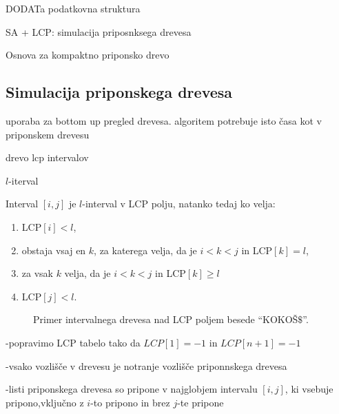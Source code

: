 DODATa podatkovna struktura

SA + LCP: simulacija priposnksega drevesa


Osnova za kompaktno priponsko drevo


\cite{Abouelhoda2004}   

\cite{Manber1990}

\subsection{Simulacija priponskega drevesa}\label{sec:STsimulacija}

uporaba za bottom up pregled drevesa. algoritem potrebuje isto časa kot v priponskem drevesu
\cite{Kasai2001}

drevo lcp intervalov 

$l$-iterval 

\begin{defi}
    Interval $[i,j]$ je $l$-interval v LCP polju, natanko tedaj ko velja:
    \begin{enumerate}
        \item LCP$[i]<l$,
        \item obstaja vsaj en $k$, za katerega velja, da je $i< k< j$ in LCP$[k]=l$,
        \item za vsak $k$ velja, da je $i< k< j$ in LCP$[k]\ge l$
        \item LCP$[j]<l$.      
    \end{enumerate}
\end{defi}

\begin{figure}[htb]
    \begin{subfigure}[T]{0.45\linewidth}
        
        
        \centering
        \subcaption*{}
        \label{fig:aSADrevo}
    \end{subfigure}
    \begin{subfigure}[T]{0.45\linewidth}        
        
        \centering
        \subcaption*{}
        \label{fig:aSAPolje}
    \end{subfigure}
    \caption{Primer intervalnega drevesa nad LCP poljem besede \enquote{KOKOŠ$\$$}.} 
    \label{fig:intervalTree}
\end{figure}

-popravimo LCP tabelo tako da $LCP[1]=-1$ in $LCP[n+1]=-1$

-vsako vozlišče v drevesu je notranje vozlišče priponnskega drevesa

-listi priponskega drevesa so pripone v najglobjem intervalu $[i,j]$, ki vsebuje pripono,vključno z $i$-to pripono in brez $j$-te pripone \cite{Abouelhoda2004}


